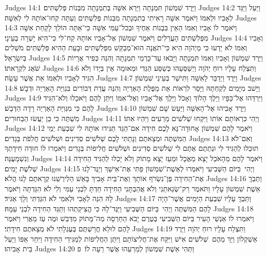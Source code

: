 Judges 14:1	וַיֵּרֶד שִׁמְשׁוֹן תִּמְנָתָה וַיַּרְא אִשָּׁה בְּתִמְנָתָה מִבְּנוֹת פְּלִשְׁתִּים׃
Judges 14:2	וַיַּעַל וַיַּגֵּד לְאָבִיו וּלְאִמּוֹ וַיֹּאמֶר אִשָּׁה רָאִיתִי בְתִמְנָתָה מִבְּנוֹת פְּלִשְׁתִּים וְעַתָּה קְחוּ־אוֹתָהּ לִי לְאִשָּׁה׃
Judges 14:3	וַיֹּאמֶר לוֹ אָבִיו וְאִמּוֹ הַאֵין בִּבְנוֹת אַחֶיךָ וּבְכל־עַמִּי אִשָּׁה כִּי־אַתָּה הוֹלֵךְ לָקַחַת אִשָּׁה מִפְּלִשְׁתִּים הָעֲרֵלִים וַיֹּאמֶר שִׁמְשׁוֹן אֶל־אָבִיו אוֹתָהּ קַח־לִי כִּי־הִיא יָשְׁרָה בְעֵינָי׃
Judges 14:4	וְאָבִיו וְאִמּוֹ לֹא יָדְעוּ כִּי מֵיְהֹוָה הִיא כִּי־תֹאֲנָה הוּא־מְבַקֵּשׁ מִפְּלִשְׁתִּים וּבָעֵת הַהִיא פְּלִשְׁתִּים מֹשְׁלִים בְּיִשְׂרָאֵל׃
Judges 14:5	וַיֵּרֶד שִׁמְשׁוֹן וְאָבִיו וְאִמּוֹ תִּמְנָתָה וַיָּבֹאוּ עַד־כַּרְמֵי תִמְנָתָה וְהִנֵּה כְּפִיר אֲרָיוֹת שֹׁאֵג לִקְרָאתוֹ׃
Judges 14:6	וַתִּצְלַח עָלָיו רוּחַ יְהֹוָה וַיְשַׁסְּעֵהוּ כְּשַׁסַּע הַגְּדִי וּמְאוּמָה אֵין בְּיָדוֹ וְלֹא הִגִּיד לְאָבִיו וּלְאִמּוֹ אֵת אֲשֶׁר עָשָׂה׃
Judges 14:7	וַיֵּרֶד וַיְדַבֵּר לָאִשָּׁה וַתִּישַׁר בְּעֵינֵי שִׁמְשׁוֹן׃
Judges 14:8	וַיָּשׁב מִיָּמִים לְקַחְתָּהּ וַיָּסַר לִרְאוֹת אֵת מַפֶּלֶת הָאַרְיֵה וְהִנֵּה עֲדַת דְּבוֹרִים בִּגְוִיַּת הָאַרְיֵה וּדְבָשׁ׃
Judges 14:9	וַיִּרְדֵּהוּ אֶל־כַּפָּיו וַיֵּלֶךְ הָלוֹךְ וְאָכֹל וַיֵּלֶךְ אֶל־אָבִיו וְאֶל־אִמּוֹ וַיִּתֵּן לָהֶם וַיֹּאכֵלוּ וְלֹא־הִגִּיד לָהֶם כִּי מִגְּוִיַּת הָאַרְיֵה רָדָה הַדְּבָשׁ׃
Judges 14:10	וַיֵּרֶד אָבִיהוּ אֶל־הָאִשָּׁה וַיַּעַשׂ שָׁם שִׁמְשׁוֹן מִשְׁתֶּה כִּי כֵּן יַעֲשׂוּ הַבַּחוּרִים׃
Judges 14:11	וַיְהִי כִּרְאוֹתָם אוֹתוֹ וַיִּקְחוּ שְׁלֹשִׁים מֵרֵעִים וַיִּהְיוּ אִתּוֹ׃
Judges 14:12	וַיֹּאמֶר לָהֶם שִׁמְשׁוֹן אָחוּדָה־נָּא לָכֶם חִידָה אִם־הַגֵּד תַּגִּידוּ אוֹתָהּ לִי שִׁבְעַת יְמֵי הַמִּשְׁתֶּה וּמְצָאתֶם וְנָתַתִּי לָכֶם שְׁלֹשִׁים סְדִינִים וּשְׁלֹשִׁים חֲלִפֹת בְּגָדִים׃
Judges 14:13	וְאִם־לֹא תוּכְלוּ לְהַגִּיד לִי וּנְתַתֶּם אַתֶּם לִי שְׁלֹשִׁים סְדִינִים וּשְׁלֹשִׁים חֲלִיפוֹת בְּגָדִים וַיֹּאמְרוּ לוֹ חוּדָה חִידָתְךָ וְנִשְׁמָעֶנָּה׃
Judges 14:14	וַיֹּאמֶר לָהֶם מֵהָאֹכֵל יָצָא מַאֲכָל וּמֵעַז יָצָא מָתוֹק וְלֹא יָכְלוּ לְהַגִּיד הַחִידָה שְׁלֹשֶׁת יָמִים׃
Judges 14:15	וַיְהִי  בַּיּוֹם הַשְּׁבִיעִי וַיֹּאמְרוּ לְאֵשֶׁת־שִׁמְשׁוֹן פַּתִּי אֶת־אִישֵׁךְ וְיַגֶּד־לָנוּ אֶת־הַחִידָה פֶּן־נִשְׂרֹף אוֹתָךְ וְאֶת־בֵּית אָבִיךְ בָּאֵשׁ הַלְירְשֵׁנוּ קְרָאתֶם לָנוּ הֲלֹא׃
Judges 14:16	וַתֵּבְךְּ אֵשֶׁת שִׁמְשׁוֹן עָלָיו וַתֹּאמֶר רַק־שְׂנֵאתַנִי וְלֹא אֲהַבְתָּנִי הַחִידָה חַדְתָּ לִבְנֵי עַמִּי וְלִי לֹא הִגַּדְתָּה וַיֹּאמֶר לָהּ הִנֵּה לְאָבִי וּלְאִמִּי לֹא הִגַּדְתִּי וְלָךְ אַגִּיד׃
Judges 14:17	וַתֵּבְךְּ עָלָיו שִׁבְעַת הַיָּמִים אֲשֶׁר־הָיָה לָהֶם הַמִּשְׁתֶּה וַיְהִי  בַּיּוֹם הַשְּׁבִיעִי וַיַּגֶּד־לָהּ כִּי הֱצִיקַתְהוּ וַתַּגֵּד הַחִידָה לִבְנֵי עַמָּהּ׃
Judges 14:18	וַיֹּאמְרוּ לוֹ אַנְשֵׁי הָעִיר בַּיּוֹם הַשְּׁבִיעִי בְּטֶרֶם יָבֹא הַחַרְסָה מַה־מָּתוֹק מִדְּבַשׁ וּמֶה עַז מֵאֲרִי וַיֹּאמֶר לָהֶם לוּלֵא חֲרַשְׁתֶּם בְּעֶגְלָתִי לֹא מְצָאתֶם חִידָתִי׃
Judges 14:19	וַתִּצְלַח עָלָיו רוּחַ יְהֹוָה וַיֵּרֶד אַשְׁקְלוֹן וַיַּךְ מֵהֶם  שְׁלֹשִׁים אִישׁ וַיִּקַּח אֶת־חֲלִיצוֹתָם וַיִּתֵּן הַחֲלִיפוֹת לְמַגִּידֵי הַחִידָה וַיִּחַר אַפּוֹ וַיַּעַל בֵּית אָבִיהוּ׃
Judges 14:20	וַתְּהִי אֵשֶׁת שִׁמְשׁוֹן לְמֵרֵעֵהוּ אֲשֶׁר רֵעָה לוֹ׃ {פ}
